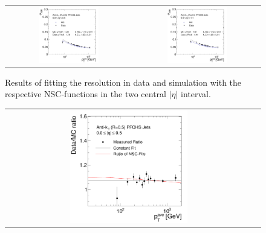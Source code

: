 \begin{description}
\begin{figure}[!p]
  \centering
  \begin{tabular}{cc}
                \includegraphics[width=0.49\textwidth]{figures/Pythia_NSCFit_Eta0_kNS_kC.pdf} &
                \includegraphics[width=0.49\textwidth]{figures/Pythia_NSCFit_Eta1_kNS_kC.pdf}\\
  \end{tabular}
  \caption{Results of fitting the resolution in data and simulation with the respective NSC-functions in the two central $|\eta|$ interval.}
  \label{fig:NSC_Fits_3}
\end{figure} 
\begin{figure}[!p]
  \centering
  \begin{tabular}{cc}
                \includegraphics[width=0.49\textwidth]{figures/Pythia_NSCFit_Eta0_kNS_kC_ratio.pdf} &

\end{tabular}
\end{figure}
\end{description}
